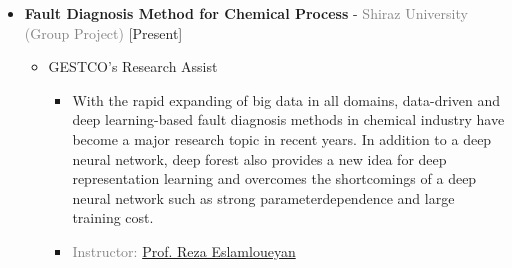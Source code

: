 \documentclass[10pt,a4paper,sans]{moderncv} %
\begin{document}
	\begin{itemize}
		\item {}  \textbf{Fault Diagnosis Method for Chemical Process} - \textcolor{gray}{Shiraz University}    \hfill\textcolor{gray}{(Group Project)}   [Present]
		\begin{itemize}
			\item GESTCO's Research Assist 
			\begin{itemize} 
		     	\item With the rapid expanding of big data in all domains, data-driven and deep learning-based fault diagnosis methods in chemical industry have become a major research topic in recent years. In addition to a deep neural network, deep forest also provides a new idea for deep representation learning and overcomes the shortcomings of a deep neural network such as strong parameterdependence and large training cost. 
				
				\item \textcolor{gray}{Instructor: \href{https://profile.shirazu.ac.ir/en/~eslamlouian}{Prof. Reza Eslamloueyan}}

			\end{itemize}
			
				\newline
			
		\end{itemize}
	\end{itemize}
\end{document}
